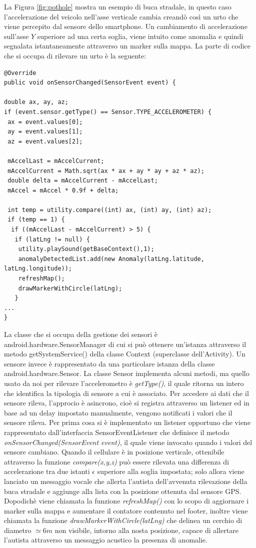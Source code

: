 \documentclass[a4paper, 11pt]{article} %
\begin{document}
La Figura \ref{fig:pothole} mostra un esempio di buca stradale, in questo caso l'accelerazione del veicolo nell'asse verticale cambia creandò così un urto che viene percepito dal sensore dello smartphone. Un cambiamento di accelerazione sull'asse $Y$ superiore ad una certa soglia, viene intuito come anomalia e quindi segnalata istantaneamente attraverso un marker sulla mappa. La parte di codice che si occupa di rilevare un urto è la seguente: 
\begin{lstlisting}
@Override
public void onSensorChanged(SensorEvent event) {

double ax, ay, az;
if (event.sensor.getType() == Sensor.TYPE_ACCELEROMETER) {
 ax = event.values[0];
 ay = event.values[1];
 az = event.values[2];
 
 mAccelLast = mAccelCurrent;
 mAccelCurrent = Math.sqrt(ax * ax + ay * ay + az * az);
 double delta = mAccelCurrent - mAccelLast;
 mAccel = mAccel * 0.9f + delta;

 int temp = utility.compare((int) ax, (int) ay, (int) az);
 if (temp == 1) {
  if ((mAccelLast - mAccelCurrent) > 5) {
   if (latLng != null) {
    utility.playSound(getBaseContext(),1);
    anomalyDetectedList.add(new Anomaly(latLng.latitude, latLng.longitude));
    refreshMap();
    drawMarkerWithCircle(latLng);
   }
...
}
\end{lstlisting} 
La classe che si occupa della gestione dei sensori è android.hardware.SensorManager di cui si può ottenere un'istanza attraverso il metodo getSystemService() della classe Context (superclasse dell'Activity). Un sensore invece è rappresentato da una particolare istanza della classe android.hardware.Sensor. La classe Sensor implementa alcuni metodi, ma quello usato da noi per rilevare l'accelerometro è \textit{getType()}, il quale ritorna un intero che identifica la tipologia di sensore a cui è associato. Per accedere ai dati che il sensore rileva, l'approcio è asincrono, cioè si registra attraverso un listener ed in base ad un delay impostato manualmente, vengono notificati i valori che il sensore rileva. Per prima cosa si è implementato un listener opportuno che viene rappresentato dall'interfaccia SensorEventListener che definisce il metodo \textit{onSensorChanged(SensorEvent event)}, il quale viene invocato quando i valori del sensore cambiano. Quando il cellulare è in posizione verticale, ottenibile attraverso la funzione \textit{compare(x,y,z)} può essere rilevata una differenza di accelerazione tra due istanti $\epsilon$ superiore alla soglia impostata; solo allora viene lanciato un messaggio vocale che allerta l'autista dell'avvenuta rilevazione della buca stradale e aggiunge alla lista con la posizione ottenuta dal sensore GPS. Dopodichè viene chiamata la funzione \textit{refreshMap()} con lo scopo di aggiornare i marker sulla mappa e aumentare il contatore contenuto nel footer, inoltre viene chiamata la funzione \textit{drawMarkerWithCircle(latLng)} che delinea un cerchio di diametro $\simeq 6m$ non visibile, intorno alla nosta posizione, capace di allertare l'autista attraverso un messaggio acustico la presenza di anomalie.
\end{document}
